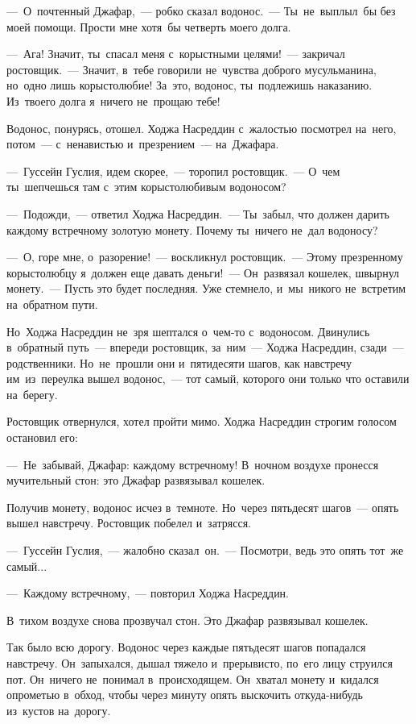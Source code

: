 \documentclass[12pt,a4paper]{book}
\begin{document}
—~О~почтенный Джафар,~— робко сказал водонос.~— Ты~не~выплыл~бы без моей помощи. Прости мне хотя~бы четверть моего долга.

—~Ага! Значит, ты~спасал меня с~корыстными целями!~— закричал ростовщик.~— Значит, в~тебе говорили не~чувства доброго мусульманина, но~одно лишь корыстолюбие! За~это, водонос, ты~подлежишь наказанию. Из~твоего долга я~ничего не~прощаю тебе!

Водонос, понурясь, отошел. Ходжа Насреддин с~жалостью посмотрел на~него, потом~— с~ненавистью и~презрением~— на~Джафара.

—~Гуссейн Гуслия, идем скорее,~— торопил ростовщик.~— О~чем ты~шепчешься там с~этим корыстолюбивым водоносом?

—~Подожди,~— ответил Ходжа Насреддин.~— Ты~забыл, что должен дарить каждому встречному золотую монету. Почему ты~ничего не~дал водоносу?

—~О, горе мне, о~разорение!~— воскликнул ростовщик.~— Этому презренному корыстолюбцу я~должен еще давать деньги!~— Он~развязал кошелек, швырнул монету.~— Пусть это будет последняя. Уже стемнело, и~мы~никого не~встретим на~обратном пути.

Но~Ходжа Насреддин не~зря шептался о~чем-то с~водоносом. Двинулись в~обратный путь~— впереди ростовщик, за~ним~— Ходжа Насреддин, сзади~— родственники. Но~не~прошли они и~пятидесяти шагов, как навстречу им~из~переулка вышел водонос,~— тот самый, которого они только что оставили на~берегу.

Ростовщик отвернулся, хотел пройти мимо. Ходжа Насреддин строгим голосом остановил его:

—~Не~забывай, Джафар: каждому встречному! В~ночном воздухе пронесся мучительный стон: это Джафар развязывал кошелек.

Получив монету, водонос исчез в~темноте. Но~через пятьдесят шагов~— опять вышел навстречу. Ростовщик побелел и~затрясся.

—~Гуссейн Гуслия,~— жалобно сказал~он.~— Посмотри, ведь это опять тот~же самый...

—~Каждому встречному,~— повторил Ходжа Насреддин.

В~тихом воздухе снова прозвучал стон. Это Джафар развязывал кошелек.

Так было всю дорогу. Водонос через каждые пятьдесят шагов попадался навстречу. Он~запыхался, дышал тяжело и~прерывисто, по~его лицу струился пот. Он~ничего не~понимал в~происходящем. Он~хватал монету и~кидался опрометью в~обход, чтобы через минуту опять выскочить откуда-нибудь из~кустов на~дорогу.
\end{document}
